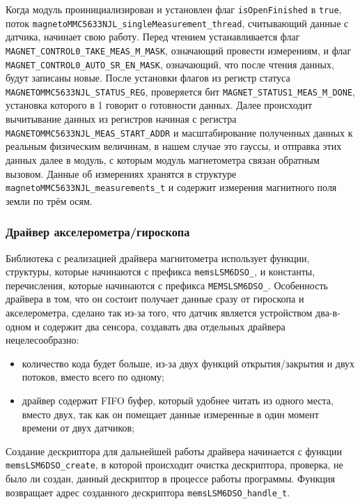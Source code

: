 Когда модуль проинициализирован и установлен флаг \lstinline{isOpenFinished} в \lstinline{true}, поток \lstinline{magnetoMMC5633NJL_singleMeasurement_thread},
считывающий данные с датчика, начинает свою работу. Перед чтением устанавливается флаг \lstinline{MAGNET_CONTROL0_TAKE_MEAS_M_MASK}, означающий провести измерениям,
и флаг \lstinline{MAGNET_CONTROL0_AUTO_SR_EN_MASK}, означающий, что после чтения данных, будут записаны новые. После установки флагов
из регистр статуса \lstinline{MAGNETOMMC5633NJL_STATUS_REG}, проверяется бит \lstinline{MAGNET_STATUS1_MEAS_M_DONE}, установка которого в 1 говорит о
готовности данных. Далее происходит вычитывание данных из регистров начиная с регистра \lstinline{MAGNETOMMC5633NJL_MEAS_START_ADDR} и масштабирование полученных данных
к реальным физическим величинам, в нашем случае это гауссы, и отправка этих данных далее в модуль, с которым модуль магнетометра связан обратным вызовом.
Данные об измерениях хранятся в структуре \lstinline{magnetoMMC5633NJL_measurements_t} и содержит измерения магнитного поля земли по трём осям.

\subsubsection{Драйвер акселерометра/гироскопа}
Библиотека с реализацией драйвера магнитометра использует функции, структуры,
которые начинаются с префикса \lstinline{memsLSM6DSO_}, и константы, перечисления, которые начинаются с префикса \lstinline{MEMSLSM6DSO_}.
Особенность драйвера в том, что он состоит получает данные сразу от гироскопа и акселерометра, сделано так из-за
того, что датчик является устройством два-в-одном и содержит два сенсора, создавать два отдельных драйвера нецелесообразно:
\begin{itemize}
    \item количество кода будет больше, из-за двух функций открытия/закрытия и двух потоков, вместо всего по одному;
    \item драйвер содержит FIFO буфер, который удобнее читать из одного места, вместо двух, так как он помещает данные
    измеренные в один момент времени от двух датчиков;
\end{itemize}


Создание дескриптора для дальнейшей работы драйвера начинается с функции \lstinline{memsLSM6DSO_create}, в
которой происходит очистка 
дескриптора, проверка, не было ли создан, данный дескриптор в процессе работы программы.
Функция возвращает адрес созданного дескриптора \lstinline{memsLSM6DSO_handle_t}.

